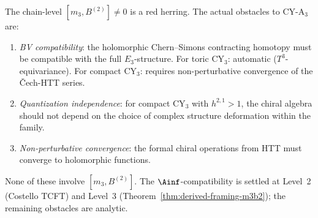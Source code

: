 \begin{remark}
\label{rem:actual-obstructions}
The chain-level $[m_3, B^{(2)}] \neq 0$ is a red herring.
The actual obstacles to CY-A$_3$ are:
\begin{enumerate}[label=\textup{(\roman*)}]
 \item \emph{BV compatibility}: the holomorphic Chern--Simons
  contracting homotopy must be compatible with the full
  $E_3$-structure.  For toric CY$_3$: automatic
  ($T^3$-equivariance).  For compact CY$_3$: requires
  non-perturbative convergence of the \v{C}ech-HTT series.
 \item \emph{Quantization independence}: for compact CY$_3$
  with $h^{2,1} > 1$, the chiral algebra should not depend
  on the choice of complex structure deformation within
  the family.
 \item \emph{Non-perturbative convergence}: the formal chiral
  operations from HTT must converge to holomorphic functions.
\end{enumerate}
None of these involve $[m_3, B^{(2)}]$.  The $\Ainf$-compatibility
is settled at Level~2 (Costello TCFT) and Level~3
(Theorem~\ref{thm:derived-framing-m3b2}); the remaining
obstacles are analytic.
\end{remark}

